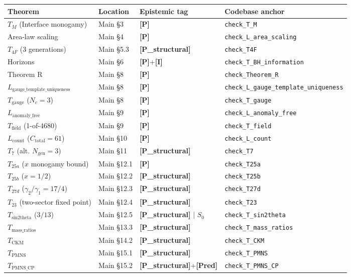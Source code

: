 \documentclass[11pt]{article}
\newcommand{\epitag}[1]{\textbf{[#1]}}
\theoremstyle{definition}
\begin{document}
\begin{center}\small
\begin{tabular}{@{}l l l l@{}}
\toprule
\textbf{Theorem} & \textbf{Location} & \textbf{Epistemic tag} & \textbf{Codebase anchor} \\
\midrule
$T_M$ (Interface monogamy) & Main \S3 & \epitag{P} & \texttt{check\_T\_M} \\
Area-law scaling & Main \S4 & \epitag{P} & \texttt{check\_L\_area\_scaling} \\
$T_{4F}$ (3 generations) & Main \S5.3 & \epitag{P\_structural} & \texttt{check\_T4F} \\
Horizons & Main \S6 & \epitag{P}+\epitag{I} & \texttt{check\_T\_BH\_information} \\
Theorem R & Main \S8 & \epitag{P} & \texttt{check\_Theorem\_R} \\
$L_{\mathrm{gauge\_template\_uniqueness}}$ & Main \S8 & \epitag{P} & \texttt{check\_L\_gauge\_template\_uniqueness} \\
$T_{\mathrm{gauge}}$ ($N_c = 3$) & Main \S8 & \epitag{P} & \texttt{check\_T\_gauge} \\
$L_{\mathrm{anomaly\_free}}$ & Main \S9 & \epitag{P} & \texttt{check\_L\_anomaly\_free} \\
$T_{\mathrm{field}}$ (1-of-4680) & Main \S9 & \epitag{P} & \texttt{check\_T\_field} \\
$L_{\mathrm{count}}$ ($C_{\mathrm{total}} = 61$) & Main \S10 & \epitag{P} & \texttt{check\_L\_count} \\
$T_7$ (alt. $N_{\mathrm{gen}} = 3$) & Main \S11 & \epitag{P\_structural} & \texttt{check\_T7} \\
$T_{25a}$ ($x$ monogamy bound) & Main \S12.1 & \epitag{P} & \texttt{check\_T25a} \\
$T_{25b}$ ($x = 1/2$) & Main \S12.2 & \epitag{P\_structural} & \texttt{check\_T25b} \\
$T_{27d}$ ($\gamma_2/\gamma_1 = 17/4$) & Main \S12.3 & \epitag{P\_structural} & \texttt{check\_T27d} \\
$T_{23}$ (two-sector fixed point) & Main \S12.4 & \epitag{P\_structural} & \texttt{check\_T23} \\
$T_{\mathrm{sin2theta}}$ ($3/13$) & Main \S12.5 & \epitag{P\_structural} $|$ $S_0$ & \texttt{check\_T\_sin2theta} \\
$T_{\mathrm{mass\_ratios}}$ & Main \S13.3 & \epitag{P\_structural} & \texttt{check\_T\_mass\_ratios} \\
$T_{\mathrm{CKM}}$ & Main \S14.2 & \epitag{P\_structural} & \texttt{check\_T\_CKM} \\
$T_{\mathrm{PMNS}}$ & Main \S15.1 & \epitag{P\_structural} & \texttt{check\_T\_PMNS} \\
$T_{\mathrm{PMNS\_CP}}$ & Main \S15.2 & \epitag{P\_structural}+\epitag{Pred} & \texttt{check\_T\_PMNS\_CP} \\
\bottomrule
\end{tabular}
\end{center}
\end{document}
